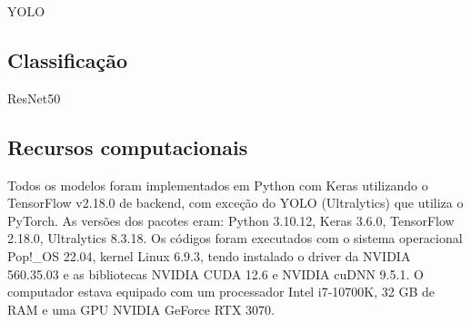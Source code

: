 \documentclass[12pt]{article}
\begin{document}
YOLO

\subsection{Classificação}
\label{sec:classification}

ResNet50

\subsection{Recursos computacionais}
\label{sec:resources}

Todos os modelos foram implementados em Python com Keras utilizando o TensorFlow v2.18.0 de backend, com exceção do YOLO (Ultralytics) que utiliza o PyTorch. As versões dos pacotes eram: Python 3.10.12, Keras 3.6.0, TensorFlow 2.18.0, Ultralytics 8.3.18.
Os códigos foram executados com o sistema operacional Pop!\_OS 22.04, kernel Linux 6.9.3, tendo instalado o driver da NVIDIA 560.35.03 e as bibliotecas NVIDIA CUDA 12.6 e NVIDIA cuDNN 9.5.1.
O computador estava equipado com um processador Intel i7-10700K, 32 GB de RAM e uma GPU NVIDIA GeForce RTX 3070.

\bigskip


\end{document}
